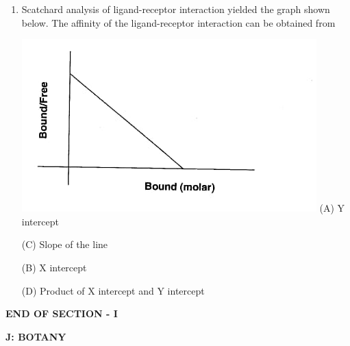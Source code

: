 \documentclass[journal]{IEEEtran}
\begin{document}
\begin{enumerate}
\begin{minipage}{0.5\textwidth}
\begin{flushright}
2) T cell Receptor


3) DOPA


4) Estradiol receptor

5) Epinephrine

6) Melanin

7) Endorphin

8) Serotonin
		\end{flushright}
		\end{minipage}


(A) P1, Q-6. R-5, S-4

(B) P-5, Q-7, R-4, 8-8

(C) P-2, Q-5, R-3, S-4

(D) P-3. Q-1, R-2, S-6

\item {Scatchard analysis of ligand-receptor interaction yielded the graph shown below. The affinity of the ligand-receptor interaction can be obtained from

	\includegraphics[width=\textwidth]{5}
(A) Y intercept

(C) Slope of the line

(B) X intercept

(D) Product of X intercept and Y intercept
}
\end{enumerate}

\begin{center}
\textbf{END OF SECTION - I}
\end{center}
\newpage
\textbf{J: BOTANY}
\end{document}
